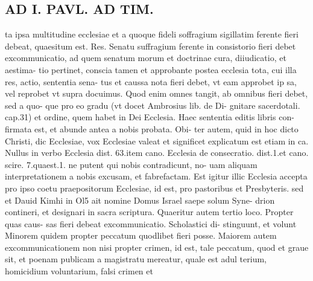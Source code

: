 \documentclass{article}
\begin{document}
\begin{pages}
\section*{AD I. PAVL. AD TIM. }
\marginpar{[ p.334 ]}\pstart ta ipsa multitudine ecclesiae et a quoque fideli soffragium sigillatim ferente fieri debeat, quaesitum est. Res. Senatu suffragium ferente in consistorio fieri debet excommunicatio, ad quem senatum morum et doctrinae cura, diiudicatio, et aestima- tio pertinet, conscia tamen et approbante postea ecclesia tota, cui illa res, actio, sententia sena- tus et caussa nota fieri debet, vt eam approbet ip sa, vel reprobet vt supra docuimus. Quod enim omnes tangit, ab omnibus fieri debet, sed a quo- que pro eo gradu (vt docet Ambrosius lib.  de Di- gnitare sacerdotali. cap.31) et ordine, quem habet in Dei Ecclesia. Haec sententia editis libris con- firmata est, et abunde antea a nobis probata. Obi- ter autem, quid in hoc dicto Christi, dic Ecclesiae, vox Ecclesiae valeat et significet explicatum est etiam in ca. Nullus in verbo Ecclesia dist. 63.item cano. Ecclesia de consecratio. dist.1.et cano. scire. 7.quaest.1. ne putent qui nobis contradicunt, no- uam aliquam interpretationem a nobis excusam, et fabrefactam. Est igitur illic Ecclesia accepta pro ipso coetu praepositorum Ecclesiae, id est, pro pastoribus et Presbyteris. sed et Dauid Kimhi in Ol5 ait nomine Domus Israel saepe solum Syne- drion contineri, et designari in sacra scriptura. Quaeritur autem tertio loco. Propter quas caus- sas fieri debeat excommunicatio. Scholastici di- stinguunt, et volunt Minorem quidem propter peccatum quodlibet fieri posse. Maiorem autem excommunicationem non nisi propter crimen, id est, tale peccatum, quod et graue sit, et poenam publicam a magistratu mereatur, quale est adul terium, homicidium voluntarium, falsi crimen et  \pend

\end{pages}
\end{document}
